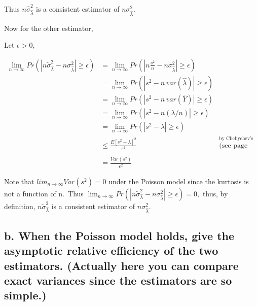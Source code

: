 \documentclass[
  letterpaper,
  DIV=11,
  numbers=noendperiod]{scrreprt}
\begin{document}
Thus \(n\hat{\sigma}^2_{\hat{\lambda}}\) is a consistent estimator of
\(n{\sigma}^2_{\hat{\lambda}}\).

Now for the other estimator,

Let \(\epsilon > 0\),

\[
\begin{aligned}
\lim_{n \to \infty}Pr(|n\tilde{\sigma}^2_{\hat{\lambda}} - n\sigma^2_{\hat{\lambda}}| \geq \epsilon)
&= \lim_{n \to \infty}Pr(|n \frac{s^2}n - n\sigma^2_{\hat{\lambda}}| \geq \epsilon) \\
&= \lim_{n \to \infty}Pr(|s^2 - n \, var(\hat{\lambda}) | \geq \epsilon) \\
&= \lim_{n \to \infty}Pr(|s^2 - n \, var(\bar{Y}) | \geq \epsilon) \\
&=\lim_{n \to \infty}Pr(|s^2 - n (\lambda/n)| \geq \epsilon) \\
&= \lim_{n \to \infty}Pr(|s^2 - \lambda | \geq \epsilon) \\
&\leq \frac{E[s^2-\lambda]^2}{\epsilon^2} & \overset{\text{by Chebychev's Inequality}}{\text{(see page 233 Cassella-Berger )}} \\ \\
&= \frac{Var(s^2)}{\epsilon^2}
\end{aligned}
\]

Note that \(lim_{n \to \infty}Var(s^2) = 0\) under the Poisson model
since the kurtosis is not a function of n.~Thus
\(\lim_{n \to \infty}Pr(|n\tilde{\sigma}^2_{\hat{\lambda}} - n\sigma^2_{\hat{\lambda}}| \geq \epsilon) = 0,\)
thus, by definition, \(n\tilde{\sigma}^2_{\hat{\lambda}}\) is a
consistent estimator of \(n\sigma^2_{\hat{\lambda}}\).

\hypertarget{b.-when-the-poisson-model-holds-give-the-asymptotic-relative-efficiency-of-the-two-estimators.-actually-here-you-can-compare-exact-variances-since-the-estimators-are-so-simple.}{%
\subsection{b. When the Poisson model holds, give the asymptotic
relative efficiency of the two estimators. (Actually here you can
compare exact variances since the estimators are so
simple.)}\label{b.-when-the-poisson-model-holds-give-the-asymptotic-relative-efficiency-of-the-two-estimators.-actually-here-you-can-compare-exact-variances-since-the-estimators-are-so-simple.}}
\end{document}

